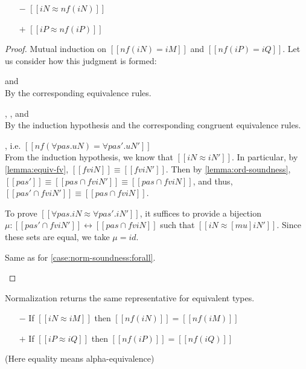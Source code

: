 \begin{lemma}
  \label{lemma:normalization-soundness}
  \hfill

  \begin{itemize}
    \item[$-$] $[[iN ≈ nf(iN)]]$
    \item[$+$] $[[iP ≈ nf(iP)]]$
  \end{itemize}

\end{lemma}
\begin{proof}
  Mutual induction on $[[nf(iN) = iM]]$ and $[[nf(iP) = iQ]]$.
  Let us consider how this judgment is formed:
  \begin{caseof}
    \item{\nameref{\ottdruleNrmNVarLabel} and \nameref{\ottdruleNrmPVarLabel}}\\ By
      the corresponding equivalence rules.
    \item{\nameref{\ottdruleNrmShiftULabel}, \nameref{\ottdruleNrmShiftDLabel},
        and \nameref{\ottdruleNrmArrowLabel}}\\
      By the induction hypothesis and the corresponding congruent equivalence rules.
    \item{\nameref{\ottdruleNrmForallLabel}}, i.e. $[[nf(∀pas.uN) = ∀pas'.uN']]$ \label{case:norm-soundness:forall}\\
      From the induction hypothesis, we
      know that $[[iN ≈ iN']]$. In particular, by \cref{lemma:equiv-fv}, $[[fv
        iN]] \equiv [[fv iN']]$.
      Then by \cref{lemma:ord-soundness}, $[[{pas'}]]
      \equiv [[{pas} ∩ fv iN']] \equiv [[{pas} ∩ fv iN]]$, and thus,
      $[[{pas'} ∩ fv iN']] \equiv [[{pas} ∩ fv iN]]$.
      
      To prove $[[∀pas.iN ≈ ∀pas'.iN']]$, it suffices to provide a bijection 
      $\mu : [[{pas'} ∩ fv iN']] \leftrightarrow [[{pas} ∩ fv iN]]$ such that
      $[[iN ≈ [mu]iN']]$. Since these sets are equal, we take $\mu = id$.
    \item{\nameref{\ottdruleNrmExistsLabel}} Same as for \cref{case:norm-soundness:forall}.
  \end{caseof}
\end{proof}


\begin{lemma}
  Normalization returns the same representative for equivalent types.

  \begin{itemize}
  \item[$-$] If $[[iN ≈ iM]]$ then $[[nf(iN)]] = [[nf(iM)]]$
  \item[$+$] If $[[iP ≈ iQ]]$ then $[[nf(iP)]] = [[nf(iQ)]]$
  \end{itemize}
  (Here equality means alpha-equivalence)
\end{lemma}

